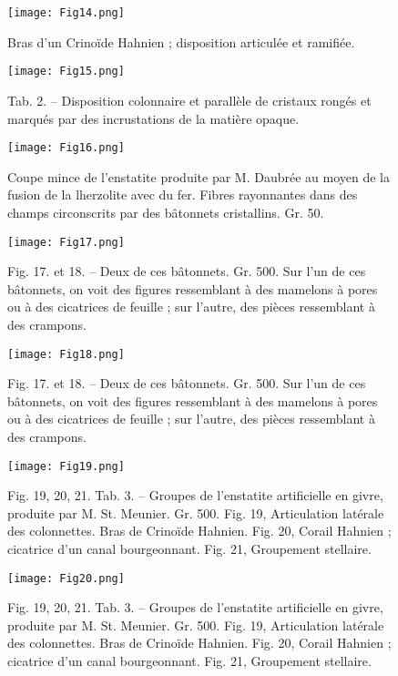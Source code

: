 \documentclass[a4paper, 12pt, oneside, french]{article}
\begin{document}
\clearpage
\begin{figure}[b]
\centering
\texttt{[image: Fig14.png]}
\caption{Bras d'un Crinoïde Hahnien ; disposition articulée et ramifiée.}
\end{figure}
\clearpage
\begin{figure}[b]
\centering
\texttt{[image: Fig15.png]}
\caption{Tab. 2. – Disposition colonnaire et parallèle de cristaux rongés et marqués par des incrustations de la matière opaque.}
\end{figure}
\clearpage
{}
\begin{figure}[b]
\texttt{[image: Fig16.png]}
\caption{Coupe mince de l'enstatite produite par M. Daubrée au moyen de la fusion de la lherzolite avec du fer. Fibres rayonnantes dans des champs circonscrits par des bâtonnets cristallins. Gr. 50.}
\centering
\end{figure}
\clearpage
\begin{figure}[b]
\centering
\texttt{[image: Fig17.png]}
\caption{Fig. 17. et 18. – Deux de ces bâtonnets. Gr. 500. Sur l'un de ces bâtonnets, on voit des figures ressemblant à des mamelons à pores ou à des cicatrices de feuille ; sur l'autre, des pièces ressemblant à des crampons.}
\end{figure}
\begin{figure}[b]
\centering
\texttt{[image: Fig18.png]}
\caption{Fig. 17. et 18. – Deux de ces bâtonnets. Gr. 500. Sur l'un de ces bâtonnets, on voit des figures ressemblant à des mamelons à pores ou à des cicatrices de feuille ; sur l'autre, des pièces ressemblant à des crampons.}
\end{figure}
\clearpage
\begin{figure}[b]
\centering
\texttt{[image: Fig19.png]}
\caption{Fig. 19, 20, 21. Tab. 3. – Groupes de l'enstatite artificielle en givre, produite par M. St. Meunier. Gr. 500. Fig. 19, Articulation latérale des colonnettes. Bras de Crinoïde Hahnien. Fig. 20, Corail Hahnien ; cicatrice d'un canal bourgeonnant. Fig. 21, Groupement stellaire.}
\end{figure}
\clearpage
\begin{figure}[b]
\centering
\texttt{[image: Fig20.png]}
\caption{Fig. 19, 20, 21. Tab. 3. – Groupes de l'enstatite artificielle en givre, produite par M. St. Meunier. Gr. 500. Fig. 19, Articulation latérale des colonnettes. Bras de Crinoïde Hahnien. Fig. 20, Corail Hahnien ; cicatrice d'un canal bourgeonnant. Fig. 21, Groupement stellaire.}
\end{figure}
\end{document}
